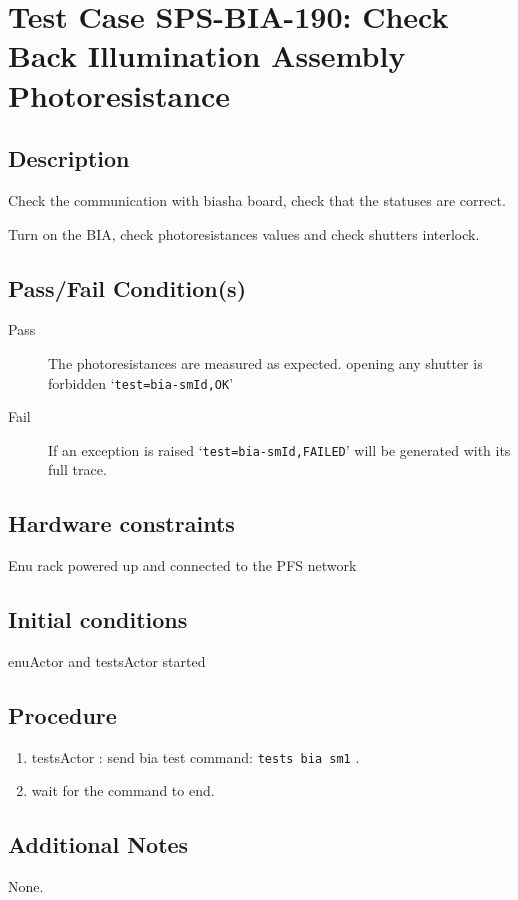 \section{Test Case SPS-BIA-190: Check Back Illumination Assembly Photoresistance}

\subsection{Description}

Check the communication with biasha board, check that the statuses are correct.

\noindent Turn on the BIA, check photoresistances values and check shutters interlock.

\subsection{Pass/Fail Condition(s)}

\begin{description}
\item [Pass] The photoresistances are measured as expected. opening any shutter is forbidden `\texttt{test=bia-smId,OK}'
\item [Fail] If an exception is raised `\texttt{test=bia-smId,FAILED}' will be generated with its full trace.
\end{description}

\subsection{Hardware constraints}

Enu rack powered up and connected to the PFS network

\subsection{Initial conditions}
enuActor and testsActor started

\subsection{Procedure}

\begin{enumerate}
    \item testsActor : send bia test command: \texttt{tests bia sm1} .
    \item wait for the command to end.
\end{enumerate}



\subsection{Additional Notes}

None.